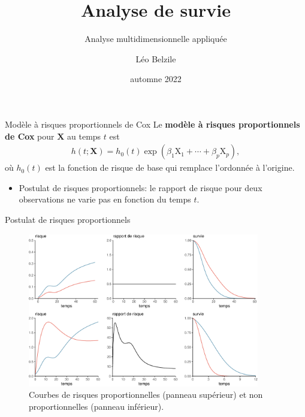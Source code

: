\documentclass[
  ignorenonframetext,
]{beamer}
\title{Analyse de survie}
\subtitle{Analyse multidimensionnelle appliquée}
\author{Léo Belzile}
\date{automne 2022}
\institute{HEC Montréal}
\providecommand{\tightlist}{%
  \setlength{\itemsep}{0pt}\setlength{\parskip}{0pt}}\usepackage{longtable,booktabs,array}
\begin{document}
\frame{\titlepage}
\ifdefined\Shaded\renewenvironment{Shaded}{\begin{tcolorbox}[frame hidden, boxrule=0pt, borderline west={3pt}{0pt}{shadecolor}, sharp corners, enhanced, breakable, interior hidden]}{\end{tcolorbox}}\fi

\begin{frame}{Modèle à risques proportionnels de Cox}
\protect\hypertarget{moduxe8le-uxe0-risques-proportionnels-de-cox}{}
Le \textbf{modèle à risques proportionnels de Cox} pour \(\mathbf{X}\)
au temps \(t\) est \begin{align*}
h(t; \mathbf{X}) = h_0(t)\exp(\beta_1\mathrm{X}_1 + \cdots + \beta_p \mathrm{X}_p),
\end{align*} où \(h_0(t)\) est la fonction de risque de base qui
remplace l'ordonnée à l'origine.

\begin{itemize}
\tightlist
\item
  Postulat de risques proportionnels: le rapport de risque pour deux
  observations ne varie pas en fonction du temps \(t\).
\end{itemize}
\end{frame}

\begin{frame}{Postulat de risques proportionnels}
\protect\hypertarget{postulat-de-risques-proportionnels}{}
\begin{figure}

{\centering \includegraphics[width=0.9\textwidth,height=\textheight]{MATH60602-diapos10_files/figure-beamer/fig-risquepropfig-1.pdf}

}

\caption{\label{fig-risquepropfig}Courbes de risques proportionnelles
(panneau supérieur) et non proportionnelles (panneau inférieur).}

\end{figure}
\end{frame}
\end{document}

